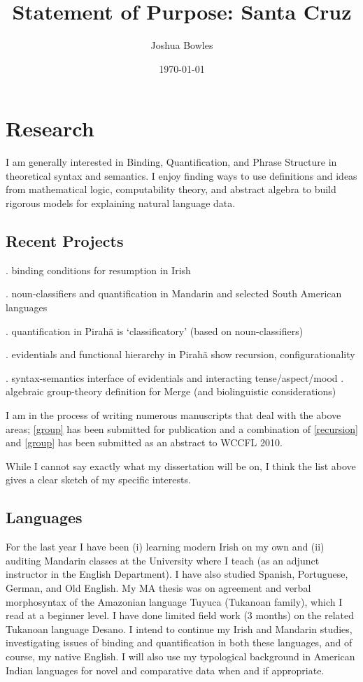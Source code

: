 \documentclass[11pt]{article}
\begin{document}
\author{Joshua Bowles}
\title{Statement of Purpose: Santa Cruz}
\date{\today}


\maketitle

\section{Research}
I am generally interested in {\sc Binding, Quantification,} and {\sc Phrase Structure} in theoretical syntax and semantics. I enjoy finding ways to use definitions and ideas from mathematical logic, computability theory, and abstract algebra to build rigorous models for explaining natural language data. 

\subsection{Recent Projects}

\ex. binding conditions for resumption in Irish

\ex. noun-classifiers and quantification in Mandarin and selected South American languages

\ex. quantification in Pirah\~a is `classificatory' (based on noun-classifiers)

\ex. evidentials and functional hierarchy in Pirah\~a show recursion, configurationality\label{recursion}

\ex. syntax-semantics interface of evidentials and interacting tense/aspect/mood
\ex. algebraic group-theory definition for Merge (and biolinguistic considerations)\label{group}

I am in the process of writing numerous manuscripts that deal with the above areas; \ref{group} has been submitted for publication and a combination of \ref{recursion} and \ref{group} has been submitted as an abstract to WCCFL 2010. 

While I cannot say exactly what my dissertation will be on, I think the list above gives a clear sketch of my specific interests.

\subsection{Languages}
For the last year I have been (i) learning modern Irish on my own and (ii) auditing Mandarin classes at the University where I teach (as an adjunct instructor in the English Department). I have also studied Spanish, Portuguese, German, and Old English. My MA thesis was on agreement and verbal morphosyntax of the Amazonian language Tuyuca (Tukanoan family), which I read at a beginner level. I have done limited field work (3 months) on the related Tukanoan language Desano. I intend to continue my Irish and Mandarin studies, investigating issues of binding and quantification in both these languages, and of course, my native English. I will also use my typological background in American Indian languages for novel and comparative data when and if appropriate.  
\end{document}
